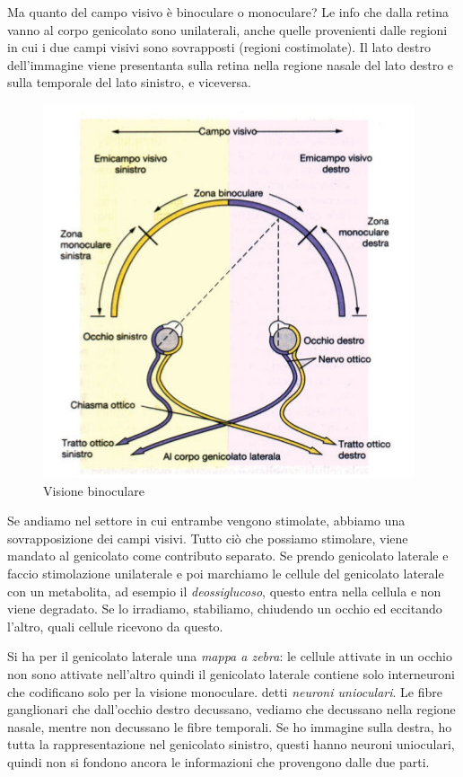 \documentclass[a4paper,12pt]{article}
\begin{document}
Ma quanto del campo visivo è binoculare o monoculare? Le info che dalla retina vanno al corpo genicolato sono unilaterali, anche quelle provenienti dalle regioni in cui i due campi visivi sono sovrapposti (regioni costimolate). Il lato destro dell'immagine viene presentanta sulla retina nella regione nasale del lato destro e sulla temporale del lato sinistro, e viceversa.

\begin{figure}[H]
\centering
\includegraphics[scale=0.4]{immagine/campo_visivo.jpg}
\caption{Visione binoculare}
\end{figure} 

Se andiamo nel settore in cui entrambe vengono stimolate, abbiamo una sovrapposizione dei campi visivi. Tutto ciò che possiamo stimolare, viene mandato al genicolato come contributo separato. Se prendo genicolato laterale e faccio stimolazione unilaterale e poi marchiamo le cellule del genicolato laterale con un metabolita, ad esempio il \emph{deossiglucoso}, questo entra nella cellula e non viene degradato. Se lo irradiamo, stabiliamo, chiudendo un occhio ed eccitando l'altro, quali cellule ricevono da questo. 

Si ha per il genicolato laterale una \emph{mappa a zebra}: le cellule attivate in un occhio non sono attivate nell'altro  quindi il genicolato laterale contiene solo interneuroni che codificano solo per la visione monoculare. detti \emph{neuroni unioculari}. Le fibre ganglionari che dall'occhio destro decussano, vediamo che decussano nella regione nasale, mentre non decussano le fibre temporali. Se ho immagine sulla destra, ho tutta la rappresentazione nel genicolato sinistro, questi hanno neuroni unioculari, quindi non si fondono ancora le informazioni che provengono dalle due parti. 
\end{document}
